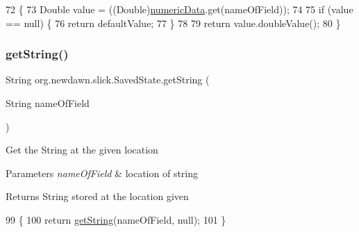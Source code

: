 \begin{DoxyCode}
72                                                                      \{
73         Double value = ((Double)\mbox{\hyperlink{classorg_1_1newdawn_1_1slick_1_1_saved_state_ad734be75c78cdbd06ed020c7d416e187}{numericData}}.get(nameOfField));
74         
75         \textcolor{keywordflow}{if} (value == null) \{
76             \textcolor{keywordflow}{return} defaultValue;
77         \}
78         
79         \textcolor{keywordflow}{return} value.doubleValue();
80     \}
\end{DoxyCode}
\mbox{\label{classorg_1_1newdawn_1_1slick_1_1_saved_state_a360539d1b89bf1eb115c2d3227a0c7a1}} 
\subsubsection{\texorpdfstring{get\+String()}{getString()}\hspace{0.1cm}{\footnotesize\ttfamily [1/2]}}
{\footnotesize\ttfamily String org.\+newdawn.\+slick.\+Saved\+State.\+get\+String (\begin{DoxyParamCaption}\item[{String}]{name\+Of\+Field }\end{DoxyParamCaption})\hspace{0.3cm}{\ttfamily [inline]}}

Get the String at the given location


\begin{DoxyParams}{Parameters}
{\em name\+Of\+Field} & location of string \\
\hline
\end{DoxyParams}
\begin{DoxyReturn}{Returns}
String stored at the location given 
\end{DoxyReturn}

\begin{DoxyCode}
99                                                 \{
100         \textcolor{keywordflow}{return} \mbox{\hyperlink{classorg_1_1newdawn_1_1slick_1_1_saved_state_a360539d1b89bf1eb115c2d3227a0c7a1}{getString}}(nameOfField, null);
101     \}
\end{DoxyCode}
\mbox{\label{classorg_1_1newdawn_1_1slick_1_1_saved_state_ac2e99c29bc57e9dfae89446cdd9ae6a3}} 
